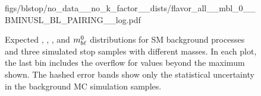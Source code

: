 \begin{figure}
{    %
    {figs/blstop/no_data__no_k_factor__dists/flavor_all__mbl_0__BMINUSL_BL_PAIRING__log.pdf}
  }
  \caption[
    Expected \MLL, \HT, \MBLASYM, and $\MBL^0$ distributions for SM
    background processes and three simulated stop samples with different masses.
  ]{
    Expected \MLL, \HT, \MBLASYM, and $\MBL^0$ distributions for SM
    background processes and three simulated stop samples with different masses.
    In each plot, the last bin includes the overflow for values beyond the
    maximum shown.
    The hashed error bands show only the statistical uncertainty in the
    background MC simulation samples.
  }
  \label{fig:no_data__no_k__inclusive_flavor_all__kinematic_dists}
\end{figure}

